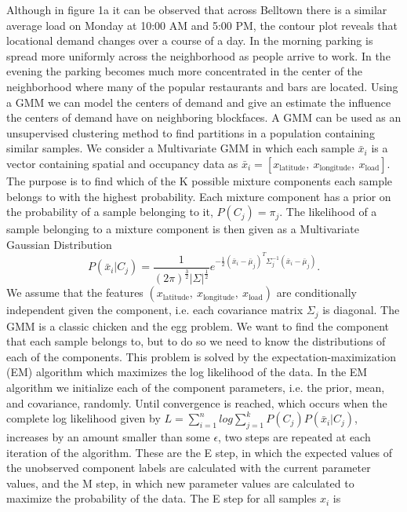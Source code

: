 \documentclass{article}
\begin{document}
\noindent
Although in figure 1a it can be observed that across Belltown there is a similar average load on Monday at 10:00 AM and 5:00 PM, the contour plot reveals that locational demand changes over a course of a day. In the morning parking is spread more uniformly across the neighborhood as people arrive to work. In the evening the parking becomes much more concentrated in the center of the neighborhood where many of the popular restaurants and bars are located.
\newline
\indent
Using a GMM we can model the centers of demand and give an estimate the influence the centers of demand have on neighboring blockfaces. A GMM can be used as an unsupervised clustering method to find partitions in a population containing similar samples. We consider a Multivariate GMM in which each sample $\bar{x}_i$ is a vector containing spatial and occupancy data as $\bar{x}_i = [x_{\text{latitude}}, \ x_{\text{longitude}}, \ x_{\text{load}}]$. The purpose is to find which of the K possible mixture components each sample belongs to with the highest probability. Each mixture component has a prior on the probability of a sample belonging to it, $P(C_j) = \pi_j$. The likelihood of a sample belonging to a mixture component is then given as a Multivariate Gaussian Distribution 
\begin{equation}
P(\bar{x}_i|C_j) = \frac{1}{(2 \pi)^{\frac{3}{2}}|\Sigma|^{\frac{1}{2}}}
e^{-\frac{1}{2}(\bar{x}_i - \bar{\mu}_j)^T\Sigma_j^{-1}(\bar{x}_i - \bar{\mu}_j)}.
\end{equation}
We assume that the features $(x_{\text{latitude}}, \ x_{\text{longitude}}, \ x_{\text{load}})$ are conditionally independent given the component, i.e. each covariance matrix $\Sigma_j$ is diagonal. The GMM is a classic chicken and the egg problem. We want to find the component that each sample belongs to, but to do so we need to know the distributions of each of the components. This problem is solved by the expectation-maximization (EM) algorithm which maximizes the log likelihood of the data. In the EM algorithm we initialize each of the component parameters, i.e. the prior, mean, and covariance, randomly. Until convergence is reached, which occurs when the complete log likelihood given by $L = \sum_{i=1}^n log \sum_{j=1}^k P(C_j)P(\bar{x}_i|C_j)$, increases by an amount smaller than some $\epsilon$, two steps are repeated at each iteration of the algorithm. These are the E step, in which the expected values of the unobserved component labels are calculated with the current parameter values, and the M step, in which new parameter values are calculated to maximize the probability of the data. The E step for all samples $x_i$ is
\end{document}
